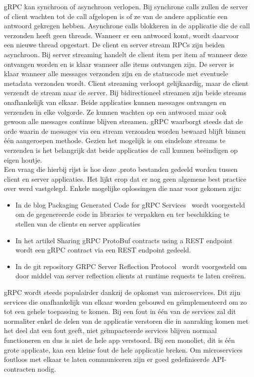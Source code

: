 gRPC kan synchroon of asynchroon verlopen. Bij synchrone calls zullen de server of client wachten tot de call afgelopen is of ze van de andere applicatie een antwoord gekregen hebben.
Asynchrone calls blokkeren in de applicatie die de call verzonden heeft geen threads. Wanneer er een antwoord komt, wordt daarvoor een nieuwe thread opgestart.
De client en server stream RPCs zijn beiden asynchroon. Bij server streaming handelt de client item per item af wanneer deze ontvangen worden en is klaar wanneer alle items ontvangen zijn.
De server is klaar wanneer alle messages verzonden zijn en de statuscode met eventuele metadata verzonden wordt.
Client streaming verloopt gelijkaardig, maar de client verzendt de stream naar de server.
Bij bidirectioneel streamen zijn beide streams onafhankelijk van elkaar. Beide applicaties kunnen messages ontvangen en verzenden in elke volgorde.
Ze kunnen wachten op een antwoord maar ook gewoon alle messages continue blijven streamen.
gRPC waarborgt steeds dat de orde waarin de messages via een stream verzonden worden bewaard blijft binnen \'e\'en aangeroepen methode.
Gezien het mogelijk is om eindeloze streams te verzenden is het belangrijk dat beide applicaties de call kunnen be\"eindigen op eigen houtje.\newline
~\autocite{grpccoreconcepts}\\

Een vraag die hierbij rijst is hoe deze .proto bestanden gedeeld worden tussen client en server applicaties.
Het lijkt erop dat er nog geen algemene best practice over werd vastgelegd. Enkele mogelijke oplossingen
die naar voor gekomen zijn:
\begin{itemize}
    \item In de blog Packaging Generated Code for gRPC Services~\parencite{protofilesharingSol1} wordt voorgesteld om de gegenereerde code in libraries te verpakken en ter beschikking te stellen van de clients en server applicaties
    \item In het artikel Sharing gRPC ProtoBuf contracts using a REST endpoint~\parencite{protofilesharingSol2} wordt een gRPC contract via een REST endpoint gedeeld.
    \item In de git repository GRPC Server Reflection Protocol~\parencite{protofilesharingSol3} wordt voorgesteld om door middel van server reflection clients at runtime requests te laten cre\"eren.
\end{itemize}

gRPC wordt steeds populairder dankzij de opkomst van microservices. Dit zijn services die onafhankelijk van elkaar worden gebouwd en ge\"{\i}mplementeerd om
zo tot een gehele toepassing te komen. Bij een fout in \'e\'en van de services zal dit normaliter enkel de delen van de applicatie verstoren die in aanraking komen
met het deel dat een fout geeft, niet ge\"{\i}mpacteerde services blijven normaal functioneren en dus is niet de hele app verstoord. Bij een monoliet, dit is één grote applicate,
kan een kleine fout de hele applicatie breken. Om microservices foutloos met elkaar te laten communiceren zijn er goed gedefinieerde API-contracten nodig.\newline
~\autocite{microsoft}\\

